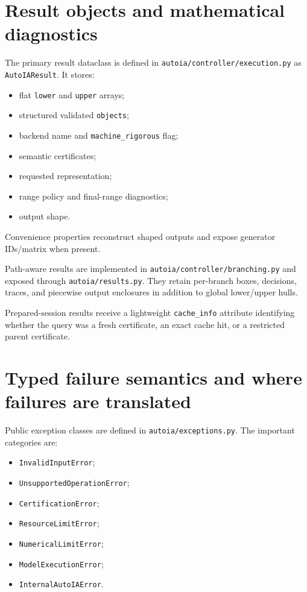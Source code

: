 \documentclass[11pt]{article}
\newcommand{\codepath}[1]{\nolinkurl{#1}}
\begin{document}
\section{Result objects and mathematical diagnostics}

The primary result dataclass is defined in
\codepath{autoia/controller/execution.py} as \texttt{AutoIAResult}.  It stores:
\begin{itemize}[leftmargin=*]
\item flat \texttt{lower} and \texttt{upper} arrays;
\item structured validated \texttt{objects};
\item backend name and \texttt{machine\_rigorous} flag;
\item semantic certificates;
\item requested representation;
\item range policy and final-range diagnostics;
\item output shape.
\end{itemize}
Convenience properties reconstruct shaped outputs and expose generator IDs/matrix
when present.

Path-aware results are implemented in
\codepath{autoia/controller/branching.py} and exposed through
\codepath{autoia/results.py}.  They retain per-branch boxes, decisions, traces,
and piecewise output enclosures in addition to global lower/upper hulls.

Prepared-session results receive a lightweight \texttt{cache\_info} attribute
identifying whether the query was a fresh certificate, an exact cache hit, or a
restricted parent certificate.

\section{Typed failure semantics and where failures are translated}

Public exception classes are defined in \codepath{autoia/exceptions.py}.  The
important categories are:
\begin{itemize}[leftmargin=*]
\item \texttt{InvalidInputError};
\item \texttt{UnsupportedOperationError};
\item \texttt{CertificationError};
\item \texttt{ResourceLimitError};
\item \texttt{NumericalLimitError};
\item \texttt{ModelExecutionError};
\item \texttt{InternalAutoIAError}.
\end{itemize}
\end{document}
